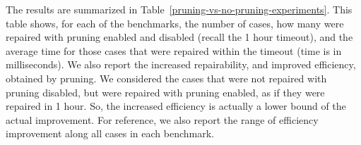 The results are summarized in Table~\ref{pruning-vs-no-pruning-experiments}. This table shows, for each of the benchmarks, the number of cases, how many were repaired with pruning enabled and disabled (recall the 1 hour timeout), and the average time for those cases that were repaired within the timeout (time is in milliseconds). We also report the increased repairability, and improved efficiency, obtained by pruning. We considered the cases that were not repaired with pruning disabled, but were repaired with pruning enabled, as if they were repaired in 1 hour. So, the increased efficiency is actually a lower bound of the actual improvement. For reference, we also report the range of efficiency improvement along all cases in each benchmark. %


